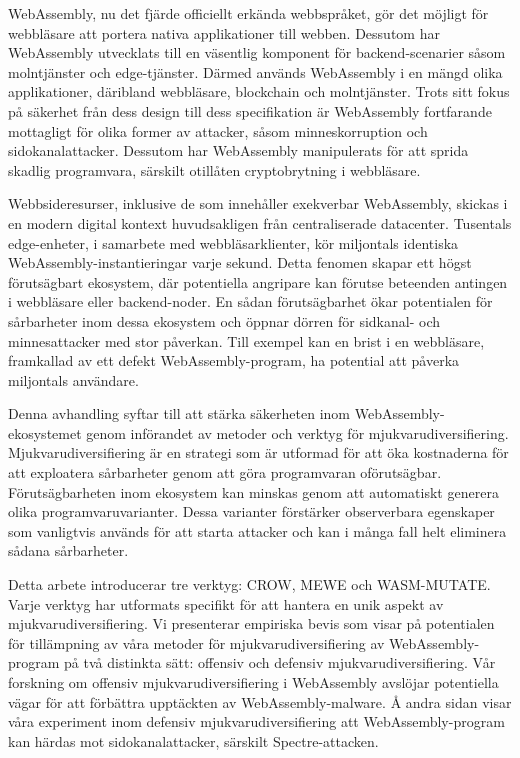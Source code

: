 WebAssembly, nu det fjärde officiellt erkända webbspråket, gör det möjligt för webbläsare att portera nativa applikationer till webben. Dessutom har WebAssembly utvecklats till en väsentlig komponent för backend-scenarier såsom molntjänster och edge-tjänster. Därmed används WebAssembly i en mängd olika applikationer, däribland webbläsare, blockchain och molntjänster. Trots sitt fokus på säkerhet från dess design till dess specifikation är WebAssembly fortfarande mottagligt för olika former av attacker, såsom minneskorruption och sidokanalattacker. Dessutom har WebAssembly manipulerats för att sprida skadlig programvara, särskilt otillåten cryptobrytning i webbläsare.

Webbsideresurser, inklusive de som innehåller exekverbar WebAssembly, skickas i en modern digital kontext huvudsakligen från centraliserade datacenter. Tusentals edge-enheter, i samarbete med webbläsarklienter, kör miljontals identiska WebAssembly-instantieringar varje sekund. Detta fenomen skapar ett högst förutsägbart ekosystem, där potentiella angripare kan förutse beteenden antingen i webbläsare eller backend-noder. En sådan förutsägbarhet ökar potentialen för sårbarheter inom dessa ekosystem och öppnar dörren för sidkanal- och minnesattacker med stor påverkan. Till exempel kan en brist i en webbläsare, framkallad av ett defekt WebAssembly-program, ha potential att påverka miljontals användare.

Denna avhandling syftar till att stärka säkerheten inom WebAssembly-ekosystemet genom införandet av metoder och verktyg för mjukvarudiversifiering. Mjukvarudiversifiering är en strategi som är utformad för att öka kostnaderna för att exploatera sårbarheter genom att göra programvaran oförutsägbar. Förutsägbarheten inom ekosystem kan minskas genom att automatiskt generera olika programvaruvarianter. Dessa varianter förstärker observerbara egenskaper som vanligtvis används för att starta attacker och kan i många fall helt eliminera sådana sårbarheter.

Detta arbete introducerar tre verktyg: CROW, MEWE och WASM-MUTATE. Varje verktyg har utformats specifikt för att hantera en unik aspekt av mjukvarudiversifiering. Vi presenterar empiriska bevis som visar på potentialen för tillämpning av våra metoder för mjukvarudiversifiering av WebAssembly-program på två distinkta sätt: offensiv och defensiv mjukvarudiversifiering. Vår forskning om offensiv mjukvarudiversifiering i WebAssembly avslöjar potentiella vägar för att förbättra upptäckten av WebAssembly-malware. Å andra sidan visar våra experiment inom defensiv mjukvarudiversifiering att WebAssembly-program kan härdas mot sidokanalattacker, särskilt Spectre-attacken.

